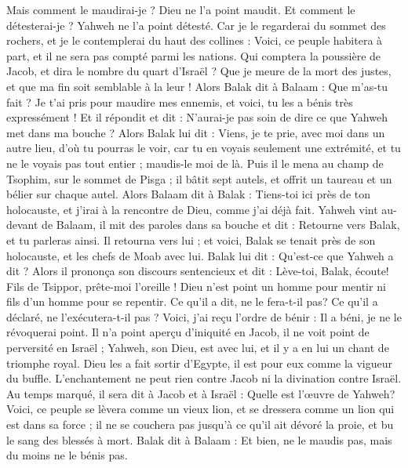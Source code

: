 \begin{multicols}{2}
Mais comment le maudirai-je ? Dieu ne l'a point maudit. Et comment le détesterai-je ? Yahweh ne l'a point détesté.
Car je le regarderai du sommet des rochers, et je le contemplerai du haut des collines : Voici, ce peuple habitera à part, et il ne sera pas compté parmi les nations.
Qui comptera la poussière de Jacob, et dira le nombre du quart d'Israël ? Que je meure de la mort des justes, et que ma fin soit semblable à la leur !
Alors Balak dit à Balaam : Que m'as-tu fait ? Je t'ai pris pour maudire mes ennemis, et voici, tu les a bénis très expressément !
Et il répondit et dit : N'aurai-je pas soin de dire ce que Yahweh met dans ma bouche ?
Alors Balak lui dit : Viens, je te prie, avec moi dans un autre lieu, d'où tu pourras le voir, car tu en voyais seulement une extrémité, et tu ne le voyais pas tout entier ; maudis-le moi de là.
Puis il le mena au champ de Tsophim, sur le sommet de Pisga ; il bâtit sept autels, et offrit un taureau et un bélier sur chaque autel.
Alors Balaam dit à Balak : Tiens-toi ici près de ton holocauste, et j'irai à la rencontre de Dieu, comme j'ai déjà fait.
Yahweh vint au-devant de Balaam, il mit des paroles dans sa bouche et dit : Retourne vers Balak, et tu parleras ainsi.
Il retourna vers lui ; et voici, Balak se tenait près de son holocauste, et les chefs de Moab avec lui. Balak lui dit : Qu'est-ce que Yahweh a dit ?
Alors il prononça son discours sentencieux et dit : Lève-toi, Balak, écoute! Fils de Tsippor, prête-moi l'oreille !
Dieu n'est point un homme pour mentir ni fils d'un homme pour se repentir. Ce qu'il a dit, ne le fera-t-il pas? Ce qu'il a déclaré, ne l'exécutera-t-il pas ?
Voici, j'ai reçu l'ordre de bénir : Il a béni, je ne le révoquerai point.
Il n'a point aperçu d'iniquité en Jacob, il ne voit point de perversité en Israël ; Yahweh, son Dieu, est avec lui, et il y a en lui un chant de triomphe royal.
Dieu les a fait sortir d'Egypte, il est pour eux comme la vigueur du buffle.
L'enchantement ne peut rien contre Jacob ni la divination contre Israël. Au temps marqué, il sera dit à Jacob et à Israël : Quelle est l'œuvre de Yahweh?
Voici, ce peuple se lèvera comme un vieux lion, et se dressera comme un lion qui est dans sa force ; il ne se couchera pas jusqu'à ce qu'il ait dévoré la proie, et bu le sang des blessés à mort.
Balak dit à Balaam : Et bien, ne le maudis pas, mais du moins ne le bénis pas.

\end{multicols}
